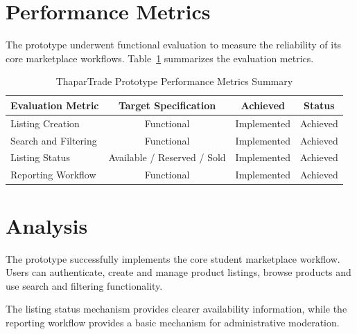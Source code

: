\documentclass[12pt,a4paper,oneside]{report}
\begin{document}
\section{Performance Metrics}

The prototype underwent functional evaluation to measure the
reliability of its core marketplace workflows. Table~\ref{tab:metrics}
summarizes the evaluation metrics.

\begin{table}[H]

\centering

\small

\begin{tabular}{lccc}

\toprule

\textbf{Evaluation Metric}
&
\textbf{Target Specification}
&
\textbf{Achieved}
&
\textbf{Status}
\\

\midrule

Listing Creation
&
Functional
&
Implemented
&
Achieved
\\

Search and Filtering
&
Functional
&
Implemented
&
Achieved
\\

Listing Status
&
Available / Reserved / Sold
&
Implemented
&
Achieved
\\

Reporting Workflow
&
Functional
&
Implemented
&
Achieved
\\

\bottomrule

\end{tabular}

\caption{ThaparTrade Prototype Performance Metrics Summary}

\label{tab:metrics}

\end{table}

\section{Analysis}

The prototype successfully implements the core student marketplace
workflow. Users can authenticate, create and manage product listings,
browse products and use search and filtering functionality.

The listing status mechanism provides clearer availability
information, while the reporting workflow provides a basic mechanism
for administrative moderation.
\end{document}
